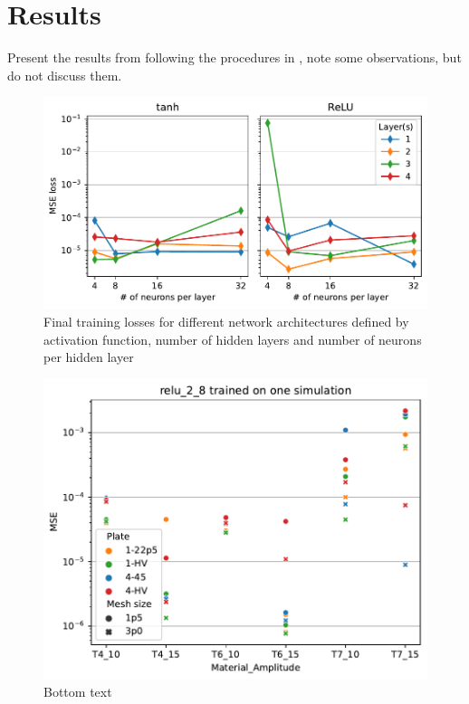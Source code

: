 \chapter{Results}\label{CH5}
Present the results from following the procedures in , note some observations, but do not discuss them.

\begin{figure}
    \centering
    \includegraphics[width=\textwidth]{Chapter/05_results/figures/para1_net.pdf}
    \caption{Final training losses for different network architectures defined by activation function, number of hidden layers and number of neurons per hidden layer}
    \label{fig:para1_net}
\end{figure}

\begin{figure}
    \centering
    \includegraphics[width=\textwidth]{Chapter/05_results/figures/para1_all.pdf}
    \caption{Bottom text}
    \label{fig:para1_all}
\end{figure}

